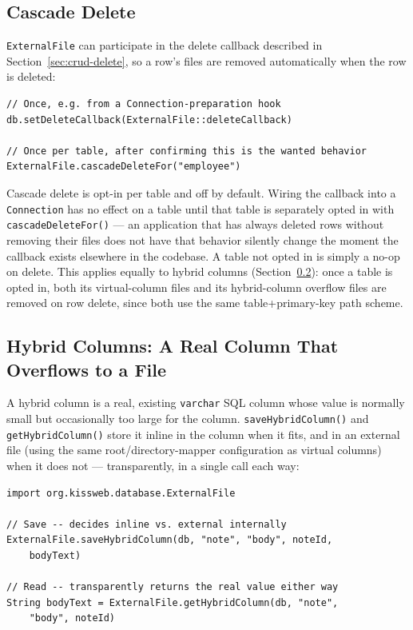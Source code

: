 \subsection{Cascade Delete}
\label{sec:file-external-cascade}

\texttt{ExternalFile} can participate in the delete callback described in Section~\ref{sec:crud-delete}, so a row's files are removed automatically when the row is deleted:

\begin{lstlisting}[style=groovy]
// Once, e.g. from a Connection-preparation hook
db.setDeleteCallback(ExternalFile::deleteCallback)

// Once per table, after confirming this is the wanted behavior
ExternalFile.cascadeDeleteFor("employee")
\end{lstlisting}

\noindent
Cascade delete is opt-in per table and off by default. Wiring the callback into a \texttt{Connection} has no effect on a table until that table is separately opted in with \texttt{cascadeDeleteFor()} --- an application that has always deleted rows without removing their files does not have that behavior silently change the moment the callback exists elsewhere in the codebase. A table not opted in is simply a no-op on delete. This applies equally to hybrid columns (Section~\ref{sec:file-external-hybrid}): once a table is opted in, both its virtual-column files and its hybrid-column overflow files are removed on row delete, since both use the same table+primary-key path scheme.

\subsection{Hybrid Columns: A Real Column That Overflows to a File}
\label{sec:file-external-hybrid}

A hybrid column is a real, existing \texttt{varchar} SQL column whose value is normally small but occasionally too large for the column. \texttt{saveHybridColumn()} and \texttt{getHybridColumn()} store it inline in the column when it fits, and in an external file (using the same root/directory-mapper configuration as virtual columns) when it does not --- transparently, in a single call each way:

\begin{lstlisting}[style=groovy]
import org.kissweb.database.ExternalFile

// Save -- decides inline vs. external internally
ExternalFile.saveHybridColumn(db, "note", "body", noteId,
    bodyText)

// Read -- transparently returns the real value either way
String bodyText = ExternalFile.getHybridColumn(db, "note",
    "body", noteId)
\end{lstlisting}

